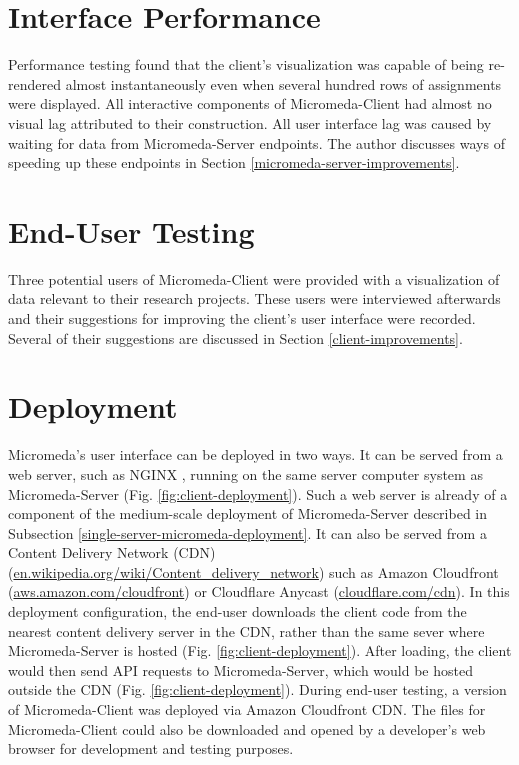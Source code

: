 \section{Interface Performance}

Performance testing found that the client's visualization was capable of being re-rendered almost instantaneously even when several hundred rows of assignments were displayed. All interactive components of Micromeda-Client had almost no visual lag attributed to their construction. All user interface lag was caused by waiting for data from Micromeda-Server endpoints. The author discusses ways of speeding up these endpoints in Section \ref{micromeda-server-improvements}.

\section{End-User Testing}

Three potential users of Micromeda-Client were provided with a visualization of data relevant to their research projects. These users were interviewed afterwards and their suggestions for improving the client's user interface were recorded. Several of their suggestions are discussed in Section \ref{client-improvements}. 

\section{Deployment}

Micromeda's user interface can be deployed in two ways. It can be served from a web server, such as NGINX \cite{reese2008nginx}, running on the same server computer system as Micromeda-Server (Fig. \ref{fig:client-deployment}). Such a web server is already of a component of the medium-scale deployment of Micromeda-Server described in Subsection \ref{single-server-micromeda-deployment}. It can also be served from a Content Delivery Network (CDN) \cite{farber2003internet} (\href{en.wikipedia.org/wiki/Content\_delivery\_network}{en.wikipedia.org/wiki/Content\_delivery\_network}) such as Amazon Cloudfront \cite{varia2014overview} (\href{aws.amazon.com/cloudfront}{aws.amazon.com/cloudfront}) or Cloudflare Anycast \cite{calder2015analyzing} (\href{cloudflare.com/cdn}{cloudflare.com/cdn}). In this deployment configuration, the end-user downloads the client code from the nearest content delivery server in the CDN, rather than the same sever where Micromeda-Server is hosted (Fig. \ref{fig:client-deployment}). After loading, the client would then send API requests to Micromeda-Server, which would be hosted outside the CDN (Fig. \ref{fig:client-deployment}). During end-user testing, a version of Micromeda-Client was deployed via Amazon Cloudfront CDN. The files for Micromeda-Client could also be downloaded and opened by a developer's web browser for development and testing purposes.


